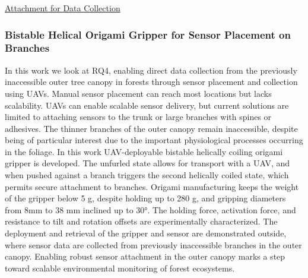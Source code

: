 
\underline{Attachment for Data Collection}

\subsubsection{Bistable Helical Origami Gripper for Sensor Placement on Branches \cite{Geckeler2022a}}

In this work we look at RQ4, enabling direct data collection from the previously inaccessible outer tree canopy in forests through sensor placement and collection using UAVs. Manual sensor placement can reach most locations but lacks scalability. UAVs can enable scalable sensor delivery, but current solutions are limited to attaching sensors to the trunk or large branches with spines or adhesives. The thinner branches of the outer canopy remain inaccessible, despite being of particular interest due to the important physiological processes occurring in the foliage. In this work UAV-deployable bistable helically coiling origami gripper is developed. The unfurled state allows for transport with a UAV, and when pushed against a branch triggers the second helically coiled state, which permits secure attachment to branches. Origami manufacturing keeps the weight of the gripper below 5 g, despite holding up to 280 g, and gripping diameters from 8mm to 38 mm inclined up to 30°. The holding force, activation force, and resistance to tilt and rotation offsets are experimentally characterized. The deployment and retrieval of the gripper and sensor are demonstrated outside, where sensor data are collected from previously inaccessible branches in the outer canopy. Enabling robust sensor
attachment in the outer canopy marks a step toward scalable environmental monitoring of forest ecosystems.


